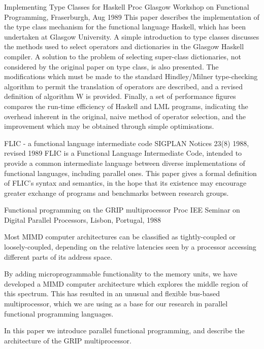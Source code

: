 {Implementing Type Classes for Haskell}
{Proc Glasgow  Workshop  on  Functional  Programming,  Fraserburgh, Aug 1989}
{
This  paper describes the implementation of the type class mechanism for
the functional language Haskell, which has been  undertaken  at  Glasgow
University.  A simple introduction to type classes discusses the methods
used to  select  operators  and  dictionaries  in  the  Glasgow  Haskell
compiler.    A   solution   to  the  problem  of  selecting  super-class
dictionaries, not considered by the original paper  on  type  class,  is
also  presented.   The  modifications which must be made to the standard
Hindley/Milner type-checking algorithm  to  permit  the  translation  of
operators  are  described,  and  a  revised definition of algorithm W is
provided. Finally, a set of performance figures  compares  the  run-time
efficiency of Haskell and LML programs, indicating the overhead inherent
in the original, naive method of operator selection, and the improvement
which may be obtained through simple optimisations.
}

{FLIC - a functional language intermediate code}
{SIGPLAN Notices 23(8) 1988, revised 1989}
{
FLIC is a Functional Language Intermediate Code, intended to
provide a common intermediate language between diverse
implementations of functional languages, including parallel
ones.
This paper gives a formal definition of FLIC's syntax and
semantics, in the hope that its existence may encourage greater
exchange of programs and benchmarks between research groups.
}

{Functional programming on the GRIP multiprocessor}
{Proc IEE Seminar on Digital Parallel Processors, Lisbon, Portugal, 1988}
{
Most MIMD computer architectures can be classified as 
tightly-coupled or loosely-coupled,
depending on the relative latencies seen by a processor accessing different
parts of its address space.

By adding microprogrammable functionality to the memory units, we have
developed a MIMD computer architecture which explores the middle region
of this spectrum.
This has resulted in an unusual and flexible bus-based multiprocessor,
which we are using as a base for our research in parallel functional programming
languages.

In this paper we introduce parallel functional programming, and describe
the architecture of the GRIP multiprocessor.
}


